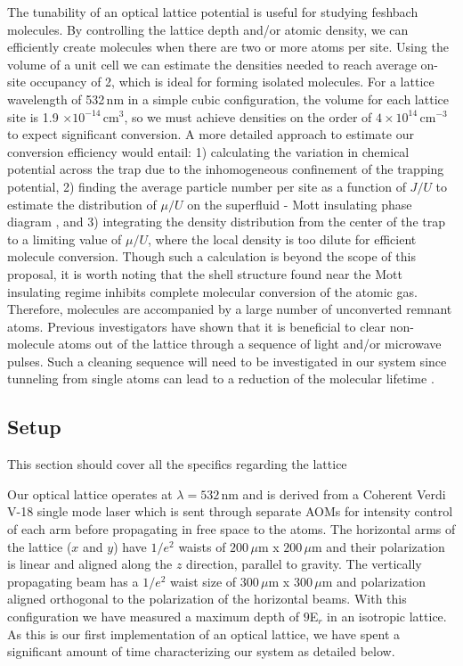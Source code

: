 The tunability of an optical lattice potential is useful for studying feshbach molecules. By controlling the lattice depth and/or atomic density, we can efficiently create molecules when there are two or more atoms per site. Using the volume of a unit cell we can estimate the densities needed to reach average on-site occupancy of 2, which is ideal for forming isolated molecules. For a lattice wavelength of 532\,nm in a simple cubic configuration, the volume for each lattice site is 1.9 $\times 10^{-14}\,$cm$^3$, so we must achieve densities on the order of $4 \times 10^{14}\,$cm$^{-3}$ to expect significant conversion. A more detailed approach to estimate our conversion efficiency would entail: 1) calculating the variation in chemical potential across the trap due to the inhomogeneous confinement of the trapping potential, 2) finding the average particle number per site as a function of $J/U$ to estimate the distribution of $\mu / U$ on the superfluid - Mott insulating phase diagram \cite{Fisher1989}, and 3) integrating the density distribution from the center of the trap to a limiting value of $\mu / U$, where the local density is too dilute for efficient molecule conversion. Though such a calculation is beyond the scope of this proposal, it is worth noting that the shell structure found near the Mott insulating regime inhibits complete molecular conversion of the atomic gas. Therefore, molecules are accompanied by a large number of unconverted remnant atoms. Previous investigators have shown that it is beneficial to clear non-molecule atoms out of the lattice through a sequence of light and/or microwave pulses. Such a cleaning sequence will need to be investigated in our system since tunneling from single atoms can lead to a reduction of the molecular lifetime \cite{Kohler2006,Thalhammer2006}.

\subsection{Setup}
\label{ssec:lattice_setup}

This section should cover all the specifics regarding the lattice

 Our optical lattice operates at $\lambda=532\,$nm and is derived from a Coherent Verdi V-18 single mode laser which is sent through separate AOMs for intensity control of each arm before propagating in free space to the atoms. The horizontal arms of the lattice ($x$ and $y$) have $1/e^2$ waists of $200\,\mu$m x $200\,\mu$m and their polarization is linear and aligned along the $z$ direction, parallel to gravity. The vertically propagating beam has a $1/e^2$ waist size of $300\,\mu$m x $300\,\mu$m and polarization aligned orthogonal to the polarization of the horizontal beams. With this configuration we have measured a maximum depth of $9$E$_r$ in an isotropic lattice. As this is our first implementation of an optical lattice, we have spent a significant amount of time characterizing our system as detailed below.


